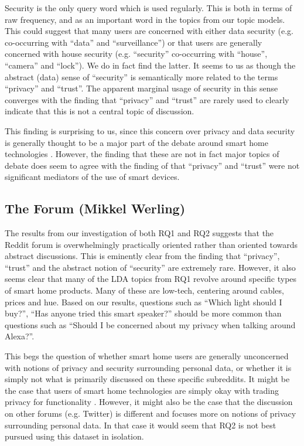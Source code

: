 \documentclass{article}
\begin{document}
    Security is the only query word which is used regularly. This is both in terms of raw frequency, and as an important word in the topics from our topic models. This could suggest that many users are concerned with either data security (e.g. co-occurring with “data” and “surveillance”) or that users are generally concerned with house security (e.g. “security” co-occurring with “house”, “camera” and “lock”). We do in fact find the latter. It seems to us as though the abstract (data) sense of “security” is semantically more related to the terms “privacy” and “trust”. The apparent marginal usage of security in this sense converges with the finding that “privacy” and “trust” are rarely used to clearly indicate that this is not a central topic of discussion. 

    This finding is surprising to us, since this concern over privacy and data security is generally thought to be a major part of the debate around smart home technologies \cite{hubert2020take,tabassum2019investigating}. However, the finding that these are not in fact major topics of debate does seem to agree with the finding of  that “privacy” and “trust” were not significant mediators of the use of smart devices. 

    \subsection{The Forum (Mikkel Werling)}
    The results from our investigation of both RQ1 and RQ2 suggests that the Reddit forum is overwhelmingly practically oriented rather than oriented towards abstract discussions. This is eminently clear from the finding that “privacy”, “trust” and the abstract notion of “security” are extremely rare. However, it also seems clear that many of the LDA topics from RQ1 revolve around specific types of smart home products. Many of these are low-tech, centering around cables, prices and hue. Based on our results, questions such as “Which light should I buy?”, “Has anyone tried this smart speaker?” should be more common than questions such as “Should I be concerned about my privacy when talking around Alexa?”. 

This begs the question of whether smart home users are generally unconcerned with notions of privacy and security surrounding personal data, or whether it is simply not what is primarily discussed on these specific subreddits. It might be the case that users of smart home technologies are simply okay with trading privacy for functionality \cite{hubert2020take, tabassum2019investigating}. However, it might also be the case that the discussion on other forums (e.g. Twitter) is different and focuses more on notions of privacy surrounding personal data. In that case it would seem that RQ2 is not best pursued using this dataset in isolation. 
\end{document}
